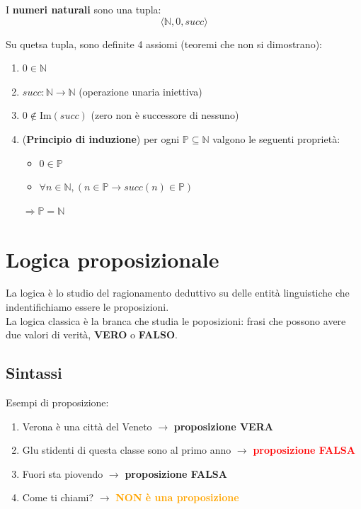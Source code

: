 \documentclass[a4paper, 12pt]{book}
\newcommand{\definizione}[2]{%
\vspace{15pt}%
\begin{tcolorbox}[
  colback=cyan!5!white,
  colframe=blue!50!black,
  title=\textbf{Definizione: #1}, %
  coltitle=white,
  fonttitle=\bfseries,
  arc=3mm,
  boxrule=0.5pt,
  enhanced,
  breakable
]
#2 %
\end{tcolorbox}
\vspace{15pt}%
}
\begin{document}
  \definizione{numeri naturali}{I \textbf{numeri naturali} sono una tupla:
    \begin{equation*}
      \langle \mathbb{N}, 0, succ \rangle
    \end{equation*}

    Su quetsa tupla, sono definite 4 assiomi (teoremi che non si dimostrano):
    \begin{enumerate}
      \item $0 \in \mathbb{N}$
      \item $succ: \mathbb{N} \rightarrow \mathbb{N}$ (operazione unaria iniettiva)
      \item $0 \notin \mathrm{Im}(succ)$ (zero non è successore di nessuno)
      \item (\textbf{Principio di induzione}) per ogni $\mathbb{P} \subseteq \mathbb{N}$ valgono le seguenti proprietà:
      \begin{itemize}
        \item $0 \in \mathbb{P}$
        \item $\forall n \in \mathbb{N}, (n \in \mathbb{P} \rightarrow succ(n) \in \mathbb{P})$
      \end{itemize}
      $\Rightarrow \mathbb{P} = \mathbb{N}$
    \end{enumerate}}


  \chapter*{Logica proposizionale}
  
  La logica è lo studio del ragionamento deduttivo su delle entità linguistiche che indentifichiamo essere le proposizioni.\\
  La logica classica è la branca che studia le poposizioni: frasi che possono avere due valori di verità, \textbf{VERO} o \textbf{FALSO}.


  \section*{Sintassi}

  Esempi di proposizione:
  \begin{enumerate}
    \item Verona è una città del Veneto $\rightarrow$ \textbf{\textcolor{green!50!black}{proposizione VERA}}
    \item Glu stidenti di questa classe sono al primo anno $\rightarrow$ \textbf{\textcolor{red}{proposizione FALSA}}
    \item Fuori sta piovendo $\rightarrow$ \textbf{\textcolor{green!50!black}{proposizione FALSA}}
    \item Come ti chiami? $\rightarrow$ \textbf{\textcolor{orange}{NON è una proposizione}}
  \end{enumerate}
\end{document}
